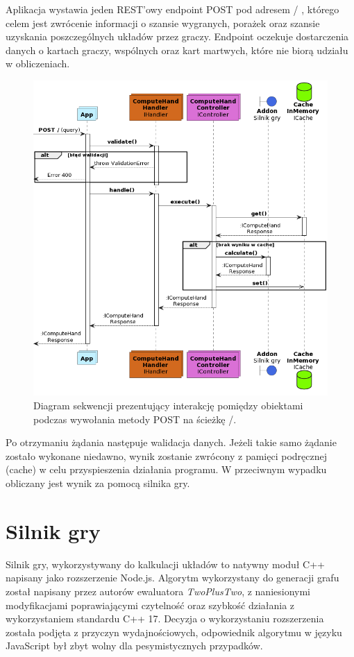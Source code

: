 Aplikacja wystawia jeden REST'owy endpoint POST pod adresem / , którego celem jest zwrócenie informacji o szansie wygranych, porażek oraz szansie uzyskania poszczególnych układów przez graczy. Endpoint oczekuje dostarczenia danych o kartach graczy, wspólnych oraz kart martwych, które nie biorą udziału w obliczeniach.

\begin{figure}[hb]
    \includegraphics[width=\textwidth]{plantuml/out/backend-sequence-diagram.png}
    \caption{Diagram sekwencji prezentujący interakcję pomiędzy obiektami podczas wywołania metody POST na ścieżkę /. }
    \label{fig:backend-sequence-diagram}
\end{figure}

Po otrzymaniu żądania następuje walidacja danych. Jeżeli takie samo żądanie zostało wykonane niedawno, wynik zostanie zwrócony z pamięci podręcznej (cache) w celu przyspieszenia działania programu. W przeciwnym wypadku obliczany jest wynik za pomocą silnika gry.

\section{Silnik gry}

Silnik gry, wykorzystywany do kalkulacji układów to natywny moduł C++ napisany jako rozszerzenie Node.js. Algorytm wykorzystany do generacji grafu został napisany przez autorów ewaluatora \emph{TwoPlusTwo}, z naniesionymi modyfikacjami poprawiającymi czytelność oraz szybkość działania z wykorzystaniem standardu C++ 17.
Decyzja o wykorzystaniu rozszerzenia została podjęta z przyczyn wydajnościowych, odpowiednik algorytmu w języku JavaScript był zbyt wolny dla pesymistycznych przypadków. 

